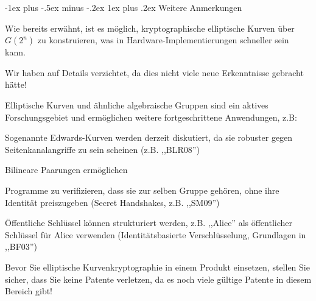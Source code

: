 \documentclass[a4paper]{article}
\makeatletter
\renewcommand{\subsubsection}{\@startsection{subsubsection}{3}{0mm}%
 {-1ex plus -.5ex minus -.2ex}%
 {1ex plus .2ex}%
 {\normalfont\small\bfseries}}
\makeatother
\begin{document}
\begin{multicols}{3}
      \subsubsection{Weitere Anmerkungen}
      \begin{itemize*}
            \item Wie bereits erwähnt, ist es möglich, kryptographische elliptische Kurven über $G(2^n)$ zu konstruieren, was in Hardware-Implementierungen schneller sein kann.
            \item Wir haben auf Details verzichtet, da dies nicht viele neue Erkenntnisse gebracht hätte!
            \item Elliptische Kurven und ähnliche algebraische Gruppen sind ein aktives Forschungsgebiet und ermöglichen weitere fortgeschrittene Anwendungen, z.B:
            \begin{itemize*}
                  \item Sogenannte Edwards-Kurven werden derzeit diskutiert, da sie robuster gegen Seitenkanalangriffe zu sein scheinen (z.B. ,,BLR08'')
                  \item Bilineare Paarungen ermöglichen
                  \begin{itemize*}
                        \item Programme zu verifizieren, dass sie zur selben Gruppe gehören, ohne ihre Identität preiszugeben (Secret Handshakes, z.B. ,,SM09'')
                        \item Öffentliche Schlüssel können strukturiert werden, z.B. ,,Alice'' als öffentlicher Schlüssel für Alice verwenden (Identitätsbasierte Verschlüsselung, Grundlagen in ,,BF03'')
                  \end{itemize*}
            \end{itemize*}
            \item Bevor Sie elliptische Kurvenkryptographie in einem Produkt einsetzen, stellen Sie sicher, dass Sie keine Patente verletzen, da es noch viele gültige Patente in diesem Bereich gibt!
      \end{itemize*}


\end{multicols}
\end{document}
